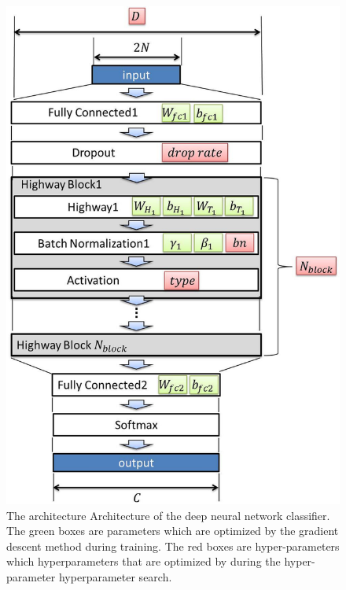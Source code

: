 \documentclass[proof]{pasj01}
\providecommand{\DIFadd}[1]{{\protect\color{blue} \sf #1}} %
\providecommand{\DIFdel}[1]{{\protect\color{red} \scriptsize #1}} %
\providecommand{\DIFaddFL}[1]{\DIFadd{#1}} %
\providecommand{\DIFdelFL}[1]{\DIFdel{#1}} %
\providecommand{\DIFaddbeginFL}{} %
\providecommand{\DIFaddendFL}{} %
\providecommand{\DIFdelbeginFL}{} %
\providecommand{\DIFdelendFL}{} %
\newcommand{\DIFscaledelfig}{0.5}
\newlength{\DIFdelgraphicswidth} %
\newlength{\DIFdelgraphicsheight} %
\newcommand{\DIFaddincludegraphics}[2][]{{\color{blue}\fbox{\DIFOincludegraphics[#1]{#2}}}} %
\newcommand{\DIFdelincludegraphics}[2][]{%
\sbox{\DIFdelgraphicsbox}{\DIFOincludegraphics[#1]{#2}}%
\settoboxwidth{\DIFdelgraphicswidth}{\DIFdelgraphicsbox} %
\settoboxtotalheight{\DIFdelgraphicsheight}{\DIFdelgraphicsbox} %
\scalebox{\DIFscaledelfig}{%
\parbox[b]{\DIFdelgraphicswidth}{\usebox{\DIFdelgraphicsbox}\\[-\baselineskip] \rule{\DIFdelgraphicswidth}{0em}}\llap{\resizebox{\DIFdelgraphicswidth}{\DIFdelgraphicsheight}{%
\setlength{\unitlength}{\DIFdelgraphicswidth}%
\begin{picture}(1,1)%
\thicklines\linethickness{2pt} %
{\color[rgb]{1,0,0}\put(0,0){\framebox(1,1){}}}%
{\color[rgb]{1,0,0}\put(0,0){\line( 1,1){1}}}%
{\color[rgb]{1,0,0}\put(0,1){\line(1,-1){1}}}%
\end{picture}%
}\hspace*{3pt}}} %
} %
\DeclareRobustCommand{\DIFaddbeginFL}{\DIFOaddbeginFL \let\includegraphics\DIFaddincludegraphics} %
\DeclareRobustCommand{\DIFaddendFL}{\DIFOaddendFL \let\includegraphics\DIFOincludegraphics} %
\DeclareRobustCommand{\DIFdelbeginFL}{\DIFOdelbeginFL \let\includegraphics\DIFdelincludegraphics} %
\DeclareRobustCommand{\DIFdelendFL}{\DIFOaddendFL \let\includegraphics\DIFOincludegraphics} %
\begin{document}
\begin{figure}[htbp]
  \begin{center}
    \includegraphics[width=130mm]{figures/model_all.eps}
  \end{center}
  \caption{\label{dnnmodel}
  \DIFdelbeginFL \DIFdelFL{The architecture }\DIFdelendFL \DIFaddbeginFL \DIFaddFL{Architecture }\DIFaddendFL of the deep neural network classifier. 
  The green boxes are parameters \DIFdelbeginFL \DIFdelFL{which are }\DIFdelendFL optimized by \DIFaddbeginFL \DIFaddFL{the }\DIFaddendFL gradient descent method during training. The red boxes are \DIFdelbeginFL \DIFdelFL{hyper-parameters which }\DIFdelendFL \DIFaddbeginFL \DIFaddFL{hyperparameters that }\DIFaddendFL are optimized \DIFdelbeginFL \DIFdelFL{by }\DIFdelendFL \DIFaddbeginFL \DIFaddFL{during }\DIFaddendFL the \DIFdelbeginFL \DIFdelFL{hyper-parameter }\DIFdelendFL \DIFaddbeginFL \DIFaddFL{hyperparameter }\DIFaddendFL search. 
}
\end{figure}
\end{document}
